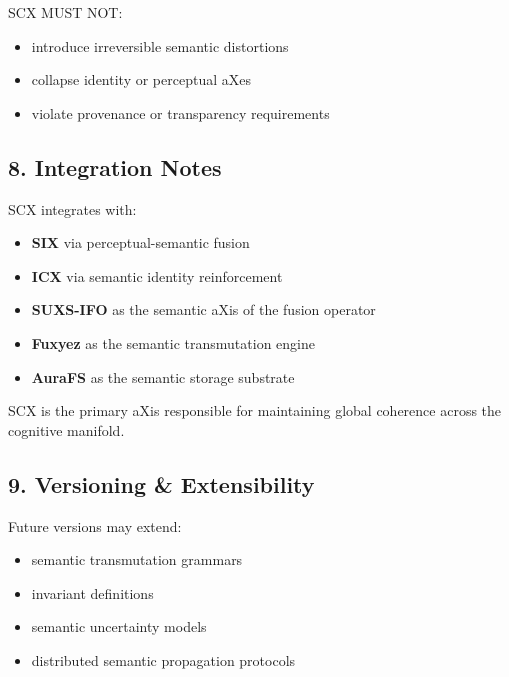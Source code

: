 SCX MUST NOT:

\begin{itemize}
\tightlist
\item
  introduce irreversible semantic distortions
\item
  collapse identity or perceptual aXes
\item
  violate provenance or transparency requirements
\end{itemize}

\subsection{8. Integration Notes}\label{integration-notes}

SCX integrates with:

\begin{itemize}
\tightlist
\item
  \textbf{SIX} via perceptual-semantic fusion
\item
  \textbf{ICX} via semantic identity reinforcement
\item
  \textbf{SUXS-IFO} as the semantic aXis of the fusion operator
\item
  \textbf{Fuxyez} as the semantic transmutation engine
\item
  \textbf{AuraFS} as the semantic storage substrate
\end{itemize}

SCX is the primary aXis responsible for maintaining global coherence across the cognitive manifold.

\subsection{9. Versioning \& Extensibility}\label{versioning-extensibility}

Future versions may extend:

\begin{itemize}
\tightlist
\item
  semantic transmutation grammars
\item
  invariant definitions
\item
  semantic uncertainty models
\item
  distributed semantic propagation protocols
\end{itemize}
